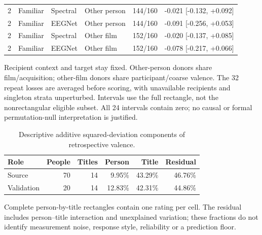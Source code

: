 \documentclass[10pt,a4paper]{article}
\begin{document}
\begin{table}[tbp]
\begin{tabular}{rlllll}
2 & Familiar & Spectral & Other person & 144/160 & -0.021 [-0.132, +0.092] \\
2 & Familiar & EEGNet & Other person & 144/160 & -0.091 [-0.256, +0.053] \\
2 & Familiar & Spectral & Other film & 152/160 & -0.020 [-0.137, +0.085] \\
2 & Familiar & EEGNet & Other film & 152/160 & -0.078 [-0.217, +0.066] \\
\bottomrule
\end{tabular}
\par\medskip\begin{minipage}{0.97\linewidth}\footnotesize Recipient context and target stay fixed. Other-person donors share film/acquisition; other-film donors share participant/coarse valence. The 32 repeat losses are averaged before scoring, with unavailable recipients and singleton strata unperturbed. Intervals use the full rectangle, not the nonrectangular eligible subset. All 24 intervals contain zero; no causal or formal permutation-null interpretation is justified.\end{minipage}
\end{table}

\begin{table}[tbp]
\centering
\small
\caption{Descriptive additive squared-deviation components of retrospective valence.}
\label{tab:variation}
\begin{tabular}{lrrrrr}
\toprule
Role & People & Titles & Person & Title & Residual \\
\midrule
Source & 70 & 14 & 9.95\% & 43.29\% & 46.76\% \\
Validation & 20 & 14 & 12.83\% & 42.31\% & 44.86\% \\
\bottomrule
\end{tabular}
\par\medskip\begin{minipage}{0.97\linewidth}\footnotesize Complete person-by-title rectangles contain one rating per cell. The residual includes person--title interaction and unexplained variation; these fractions do not identify measurement noise, response style, reliability or a prediction floor.\end{minipage}
\end{table}
\end{document}
